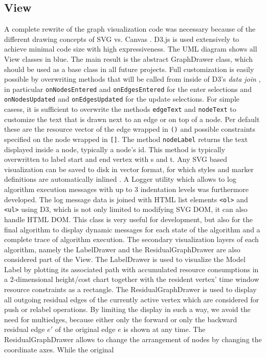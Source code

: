 \subsection{View}\label{sec:view}
A complete rewrite of the graph visualization code was necessary because of the different drawing concepts of SVG vs. Canvas . D3.js is used extensively to achieve minimal code size with high expressiveness. The UML diagram  shows all View classes in blue. The main result is the abstract GraphDrawer class, which should be used as a base class in all future projects. Full customization is easily possible by overwriting methods that will be called from inside of D3's \textit{data join} , in particular \texttt{onNodesEntered} and \texttt{onEdgesEntered} for the enter selections and \texttt{onNodesUpdated} and \texttt{onEdgesUpdated} for the update selections. For simple casess, it is sufficient to overwrite the methods \texttt{edgeText} and \texttt{nodeText} to customize the text that is drawn next to an edge or on top of a node. Per default these are the resource vector of the edge wrapped in \texttt{()} and possible constraints specified on the node wrapped in \texttt{[]}. The method \texttt{nodeLabel} returns the text displayed inside a node, typically a node's id. This method is typically overwritten to label start and end vertex with s and t. Any SVG based visualization can be saved to disk in vector format, for which styles and marker definitions are automatically inlined . A Logger utility which allows to log algorithm execution messages with up to 3 indentation levels was furthermore developed. The log message data is joined with HTML list elements \texttt{<ol>} and \texttt{<ul>} using D3, which is not only limited to modifying SVG DOM, it can also handle HTML DOM. This class is very useful for development, but also for the final algorithm to display dynamic messages for each state of the algorithm and a complete trace of algorithm execution. The secondary visualization layers of each algorithm, namely the LabelDrawer and the ResidualGraphDrawer are also considered part of the View. The LabelDrawer  is used to visualize the Model Label by plotting its associated path with accumulated resource consumptions in a 2-dimensional height/cost chart together with the resident vertex' time window resource constraints as a rectangle. The ResidualGraphDrawer  is used to display all outgoing residual edges of the currently active vertex which are considered for push or relabel operations. By limiting the display in such a way, we avoid the need for multiedges, because either only the forward or only the backward residual edge $e'$ of the original edge $e$ is shown at any time. The ResidualGraphDrawer allows to change the arrangement of nodes by changing the coordinate axes. While the original 